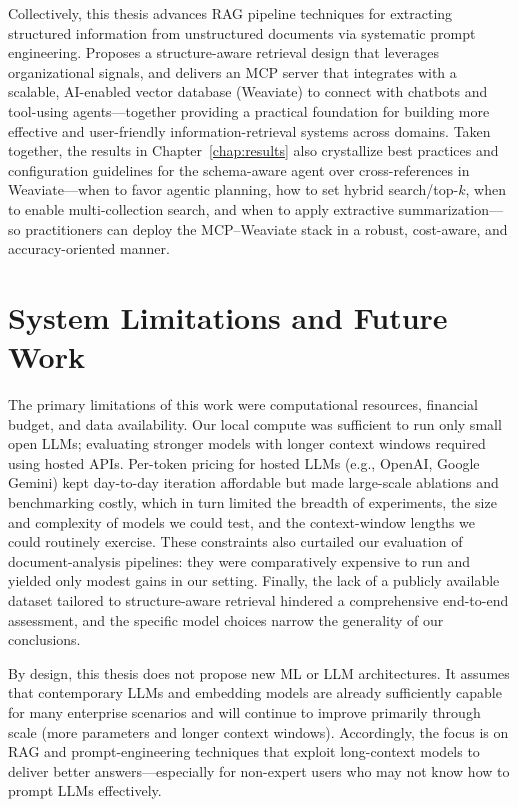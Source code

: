 Collectively, this thesis advances \gls{RAG} pipeline techniques for extracting structured information from unstructured documents via systematic prompt engineering. Proposes a structure-aware retrieval design that leverages organizational signals, and delivers an \gls{MCP} server that integrates with a scalable, AI-enabled vector database (Weaviate) to connect with chatbots and tool-using agents—together providing a practical foundation for building more effective and user-friendly information-retrieval systems across domains. Taken together, the results in Chapter~\ref{chap:results} also crystallize best practices and configuration guidelines for the schema-aware agent over cross-references in Weaviate—when to favor agentic planning, how to set hybrid search/top-$k$, when to enable multi-collection search, and when to apply extractive summarization—so practitioners can deploy the MCP–Weaviate stack in a robust, cost-aware, and accuracy-oriented manner.
\section{System Limitations and Future Work}
The primary limitations of this work were computational resources, financial budget, and data availability. Our local compute was sufficient to run only small open \glspl{LLM}; evaluating stronger models with longer context windows required using hosted APIs. Per-token pricing for hosted \glspl{LLM} (e.g., OpenAI, Google Gemini) kept day-to-day iteration affordable but made large-scale ablations and benchmarking costly, which in turn limited the breadth of experiments, the size and complexity of models we could test, and the context-window lengths we could routinely exercise. These constraints also curtailed our evaluation of document-analysis pipelines: they were comparatively expensive to run and yielded only modest gains in our setting. Finally, the lack of a publicly available dataset tailored to structure-aware retrieval hindered a comprehensive end-to-end assessment, and the specific model choices narrow the generality of our conclusions.

By design, this thesis does not propose new \gls{ML} or \gls{LLM} architectures. It assumes that contemporary \glspl{LLM} and embedding models are already sufficiently capable for many enterprise scenarios and will continue to improve primarily through scale (more parameters and longer context windows). Accordingly, the focus is on \gls{RAG} and prompt-engineering techniques that exploit long-context models to deliver better answers—especially for non-expert users who may not know how to prompt \glspl{LLM} effectively.

